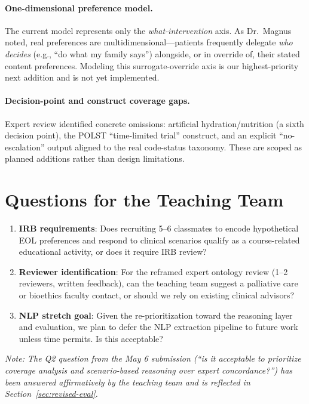 \documentclass[11pt]{article}
\begin{document}
\paragraph{One-dimensional preference model.}
The current model represents only the \emph{what-intervention} axis. As Dr.\ Magnus noted, real preferences are multidimensional---patients frequently delegate \emph{who decides} (e.g., ``do what my family says'') alongside, or in override of, their stated content preferences. Modeling this surrogate-override axis is our highest-priority next addition and is not yet implemented.

\paragraph{Decision-point and construct coverage gaps.}
Expert review identified concrete omissions: artificial hydration/nutrition (a sixth decision point), the POLST ``time-limited trial'' construct, and an explicit ``no-escalation'' output aligned to the real code-status taxonomy. These are scoped as planned additions rather than design limitations.

\section{Questions for the Teaching Team}

\begin{enumerate}[nosep]
    \item \textbf{IRB requirements}: Does recruiting 5--6 classmates to encode hypothetical EOL preferences and respond to clinical scenarios qualify as a course-related educational activity, or does it require IRB review?
    \item \textbf{Reviewer identification}: For the reframed expert ontology review (1--2 reviewers, written feedback), can the teaching team suggest a palliative care or bioethics faculty contact, or should we rely on existing clinical advisors?
    \item \textbf{NLP stretch goal}: Given the re-prioritization toward the reasoning layer and evaluation, we plan to defer the NLP extraction pipeline to future work unless time permits. Is this acceptable?
\end{enumerate}

\noindent \emph{Note: The Q2 question from the May 6 submission (``is it acceptable to prioritize coverage analysis and scenario-based reasoning over expert concordance?'') has been answered affirmatively by the teaching team and is reflected in Section~\ref{sec:revised-eval}.}
\end{document}
